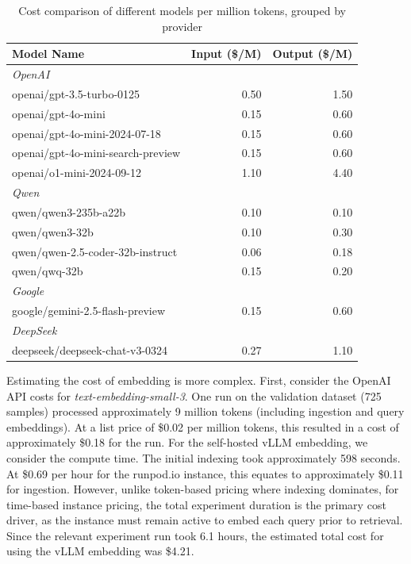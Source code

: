 \begin{table}[!ht]
    \centering
    \caption{Cost comparison of different models per million tokens, grouped by provider}
    \label{tab:model_costs}
    \begin{tabular}{lrr}
        \hline
        \textbf{Model Name} & \textbf{Input (\$/M)} & \textbf{Output (\$/M)} \\
        \hline
        \multicolumn{3}{l}{\textit{OpenAI}} \\
        openai/gpt-3.5-turbo-0125 & 0.50 & 1.50 \\
        openai/gpt-4o-mini & 0.15 & 0.60 \\
        openai/gpt-4o-mini-2024-07-18 & 0.15 & 0.60 \\
        openai/gpt-4o-mini-search-preview & 0.15 & 0.60 \\
        openai/o1-mini-2024-09-12 & 1.10 & 4.40 \\
        \hline
        \multicolumn{3}{l}{\textit{Qwen}} \\
        qwen/qwen3-235b-a22b & 0.10 & 0.10 \\
        qwen/qwen3-32b & 0.10 & 0.30 \\
        qwen/qwen-2.5-coder-32b-instruct & 0.06 & 0.18 \\
        qwen/qwq-32b & 0.15 & 0.20 \\
        \hline
        \multicolumn{3}{l}{\textit{Google}} \\
        google/gemini-2.5-flash-preview & 0.15 & 0.60 \\
        \hline
        \multicolumn{3}{l}{\textit{DeepSeek}} \\
        deepseek/deepseek-chat-v3-0324 & 0.27 & 1.10 \\
        \hline
    \end{tabular}
\end{table}

Estimating the cost of embedding is more complex. First, consider the OpenAI API costs for \textit{text-embedding-small-3}. One run on the validation dataset (725 samples) processed approximately 9 million tokens (including ingestion and query embeddings). At a list price of \$0.02 per million tokens, this resulted in a cost of approximately \$0.18 for the run. For the self-hosted vLLM embedding, we consider the compute time. The initial indexing took approximately 598 seconds. At \$0.69 per hour for the runpod.io instance, this equates to approximately \$0.11 for ingestion. However, unlike token-based pricing where indexing dominates, for time-based instance pricing, the total experiment duration is the primary cost driver, as the instance must remain active to embed each query prior to retrieval. Since the relevant experiment run took 6.1 hours, the estimated total cost for using the vLLM embedding was \$4.21.




